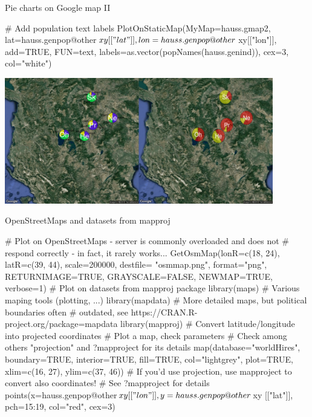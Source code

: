 \documentclass[compress, ucs, xelatex, 11pt, xcolor=svgnames,
  hyperref={
    bookmarks=true,
    unicode=true,
    colorlinks=true,
    pdftitle={Molecular data in R},
    plainpages=false,
    pdfauthor={Vojtech Zeisek},
    pdfsubject={Course about phylogeny and evolution in R},
    pdfcreator={XeLaTeX},
    pdfkeywords={R, evolution, phylogeny, molecular data},
    linkcolor=Tomato,
    anchorcolor=SaddleBrown,
    citecolor=Goldenrod,
    filecolor=DarkMagenta,
    menucolor=Sienna,
    urlcolor=DarkTurquoise,
    pdftex},
  url={hyphens, lowtilde} %
  ]{beamer}
\begin{document}
\begin{frame}[fragile]{Pie charts on Google map II}
  \begin{spluscode}
    # Add population text labels
    PlotOnStaticMap(MyMap=hauss.gmap2, lat=hauss.genpop@other$xy[["lat"]],
      lon=hauss.genpop@other$xy[["lon"]], add=TRUE, FUN=text,
      labels=as.vector(popNames(hauss.genind)), cex=3, col="white")
  \end{spluscode}
  \begin{center}
    \includegraphics[height=5.5cm]{map_pie_google.png}
  \end{center}
\end{frame}

\begin{frame}[fragile]{OpenStreetMaps and datasets from mapproj}
  \begin{spluscode}
    # Plot on OpenStreetMaps - server is commonly overloaded and does not
    # respond correctly - in fact, it rarely works...
    GetOsmMap(lonR=c(18, 24), latR=c(39, 44), scale=200000, destfile=
      "osmmap.png", format="png", RETURNIMAGE=TRUE, GRAYSCALE=FALSE,
      NEWMAP=TRUE, verbose=1)
    # Plot on datasets from mapproj package
    library(maps) # Various maping tools (plotting, ...)
    library(mapdata) # More detailed maps, but political boundaries often
           # outdated, see https://CRAN.R-project.org/package=mapdata
    library(mapproj) # Convert latitude/longitude into projected coordinates
    # Plot a map, check parameters
    # Check among others "projection" and ?mapproject for its details
    map(database="worldHires", boundary=TRUE, interior=TRUE, fill=TRUE,
      col="lightgrey", plot=TRUE, xlim=c(16, 27), ylim=c(37, 46))
    # If you'd use projection, use mapproject to convert also coordinates!
    # See ?mapproject for details
    points(x=hauss.genpop@other$xy[["lon"]], y=hauss.genpop@other$xy
      [["lat"]], pch=15:19, col="red", cex=3)
  \end{spluscode}
\end{frame}
\end{document}
